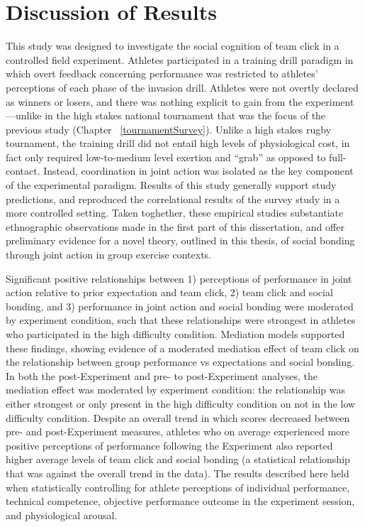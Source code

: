 \section{Discussion of Results}
This study was designed to investigate the social cognition of team click in a controlled field experiment.  Athletes participated in a training drill paradigm in which overt feedback concerning performance was restricted to athletes' perceptions of each phase of the invasion drill.  Athletes were not overtly declared as winners or losers, and there was nothing explicit to gain from the experiment---unlike in the high stakes national tournament that was the focus of the previous study (Chapter ~\ref{tournamentSurvey}).  Unlike a high stakes rugby tournament, the training drill did not entail high levels of physiological cost, in fact only required low-to-medium level exertion and ``grab'' as opposed to full-contact. Instead, coordination in joint action was isolated as the key component of the experimental paradigm.  Results of this study generally support study predictions, and reproduced the correlational results of the survey study in a more controlled setting. Taken toghether, these empirical studies substantiate ethnographic observations made in the first part of this dissertation, and offer preliminary evidence for a novel theory, outlined in this thesis, of social bonding through joint action in group exercise contexts.

Significant positive relationships between 1) perceptions of performance in joint action relative to prior expectation and team click, 2) team click and social bonding,  and 3) performance in joint action and social bonding were moderated by experiment condition, such that these relationships were strongest in athletes who participated in the high difficulty condition.  Mediation models supported these findings, showing evidence of a moderated mediation effect of team click on the relationship between group performance vs expectations and social bonding.  In both the post-Experiment and pre- to post-Experiment analyses, the mediation effect was moderated by experiment condition: the relationship was either strongest or only present in the high difficulty condition on not in the low difficulty condition.  Despite an overall trend in which scores decreased between pre- and post-Experiment measures, athletes who on average experienced more positive perceptions of performance following the Experiment also reported higher average levels of team click and social bonding (a statistical relationship that was against the overall trend in the data).  The results described here held when statistically controlling for athlete perceptions of individual performance, technical competence, objective performance outcome in the experiment session, and physiological arousal.

